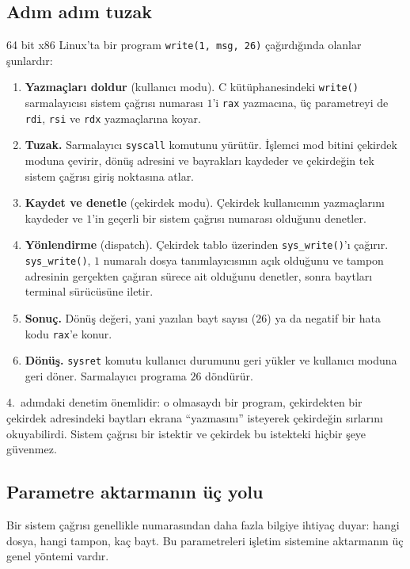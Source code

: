 \documentclass[11pt,a4paper]{article}
\newcommand{\cmd}[1]{\texttt{#1}}
\begin{document}
\subsection{Adım adım tuzak}

64 bit x86 Linux'ta bir program \cmd{write(1, msg, 26)} çağırdığında olanlar şunlardır:

\begin{enumerate}[leftmargin=1.4em]
  \item \textbf{Yazmaçları doldur} (kullanıcı modu). C kütüphanesindeki \cmd{write()} sarmalayıcısı sistem çağrısı numarası $1$'i \texttt{rax} yazmacına, üç parametreyi de \texttt{rdi}, \texttt{rsi} ve \texttt{rdx} yazmaçlarına koyar.
  \item \textbf{Tuzak.} Sarmalayıcı \texttt{syscall} komutunu yürütür. İşlemci mod bitini çekirdek moduna çevirir, dönüş adresini ve bayrakları kaydeder ve çekirdeğin tek sistem çağrısı giriş noktasına atlar.
  \item \textbf{Kaydet ve denetle} (çekirdek modu). Çekirdek kullanıcının yazmaçlarını kaydeder ve $1$'in geçerli bir sistem çağrısı numarası olduğunu denetler.
  \item \textbf{Yönlendirme} (dispatch). Çekirdek tablo üzerinden \cmd{sys\_write()}'ı çağırır. \cmd{sys\_write()}, $1$ numaralı dosya tanımlayıcısının açık olduğunu ve tampon adresinin gerçekten çağıran sürece ait olduğunu denetler, sonra baytları terminal sürücüsüne iletir.
  \item \textbf{Sonuç.} Dönüş değeri, yani yazılan bayt sayısı ($26$) ya da negatif bir hata kodu \texttt{rax}'e konur.
  \item \textbf{Dönüş.} \texttt{sysret} komutu kullanıcı durumunu geri yükler ve kullanıcı moduna geri döner. Sarmalayıcı programa $26$ döndürür.
\end{enumerate}

4.~adımdaki denetim önemlidir: o olmasaydı bir program, çekirdekten bir çekirdek adresindeki baytları ekrana ``yazmasını'' isteyerek çekirdeğin sırlarını okuyabilirdi. Sistem çağrısı bir istektir ve çekirdek bu istekteki hiçbir şeye güvenmez.

\subsection{Parametre aktarmanın üç yolu}

Bir sistem çağrısı genellikle numarasından daha fazla bilgiye ihtiyaç duyar: hangi dosya, hangi tampon, kaç bayt. Bu parametreleri işletim sistemine aktarmanın üç genel yöntemi vardır.
\end{document}
